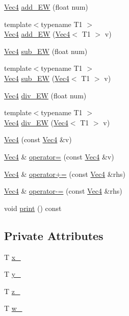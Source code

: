 \begin{DoxyCompactItemize}
\item 
\mbox{\hyperlink{class_vec4}{Vec4}} \mbox{\hyperlink{class_vec4_a7c53c3f53c0e46db0389daf2d2f52ee1}{add\+\_\+\+EW}} (float num)
\item 
{\footnotesize template$<$typename T1 $>$ }\\\mbox{\hyperlink{class_vec4}{Vec4}} \mbox{\hyperlink{class_vec4_a5b1357147d90b510db62a89bf700ed04}{add\+\_\+\+EW}} (\mbox{\hyperlink{class_vec4}{Vec4}}$<$ T1 $>$ v)
\item 
\mbox{\hyperlink{class_vec4}{Vec4}} \mbox{\hyperlink{class_vec4_a62f7104ab1c2585bda2ebc1ef20b4a91}{sub\+\_\+\+EW}} (float num)
\item 
{\footnotesize template$<$typename T1 $>$ }\\\mbox{\hyperlink{class_vec4}{Vec4}} \mbox{\hyperlink{class_vec4_a940a406db252f6d638926599ed35dc1a}{sub\+\_\+\+EW}} (\mbox{\hyperlink{class_vec4}{Vec4}}$<$ T1 $>$ v)
\item 
\mbox{\hyperlink{class_vec4}{Vec4}} \mbox{\hyperlink{class_vec4_a7bf4bc251ed964206e88033102ec6ced}{div\+\_\+\+EW}} (float num)
\item 
{\footnotesize template$<$typename T1 $>$ }\\\mbox{\hyperlink{class_vec4}{Vec4}} \mbox{\hyperlink{class_vec4_a75606102b31f71a2a8370608d517bf13}{div\+\_\+\+EW}} (\mbox{\hyperlink{class_vec4}{Vec4}}$<$ T1 $>$ v)
\item 
\mbox{\hyperlink{class_vec4_a97bc391079bc751f343234af6e6fb512}{Vec4}} (const \mbox{\hyperlink{class_vec4}{Vec4}} \&v)
\item 
\mbox{\hyperlink{class_vec4}{Vec4}} \& \mbox{\hyperlink{class_vec4_a2dff6e3360af190d819eceda32bcfd11}{operator=}} (const \mbox{\hyperlink{class_vec4}{Vec4}} \&v)
\item 
\mbox{\hyperlink{class_vec4}{Vec4}} \& \mbox{\hyperlink{class_vec4_abd1f711e35e511b6a08d1596d407e5f9}{operator+=}} (const \mbox{\hyperlink{class_vec4}{Vec4}} \&rhs)
\item 
\mbox{\hyperlink{class_vec4}{Vec4}} \& \mbox{\hyperlink{class_vec4_a548b78d8379bf1a0b01b7e24b2a62bc1}{operator-\/=}} (const \mbox{\hyperlink{class_vec4}{Vec4}} \&rhs)
\item 
void \mbox{\hyperlink{class_vec4_a9698af7632b2cf25f3f31a3ac88b8c16}{print}} () const
\end{DoxyCompactItemize}
\subsection*{Private Attributes}
\begin{DoxyCompactItemize}
\item 
T \mbox{\hyperlink{class_vec4_af15cf636cd973c2d642173c411750f81}{x\+\_\+}}
\item 
T \mbox{\hyperlink{class_vec4_a567fa1d5ba768bd21ca5e10241b3c3a9}{y\+\_\+}}
\item 
T \mbox{\hyperlink{class_vec4_abca4a20e692727dffbd43c0c46b7d869}{z\+\_\+}}
\item 
T \mbox{\hyperlink{class_vec4_a63ad1d4ce4bf1e9b082778a06b892d89}{w\+\_\+}}
\end{DoxyCompactItemize}

